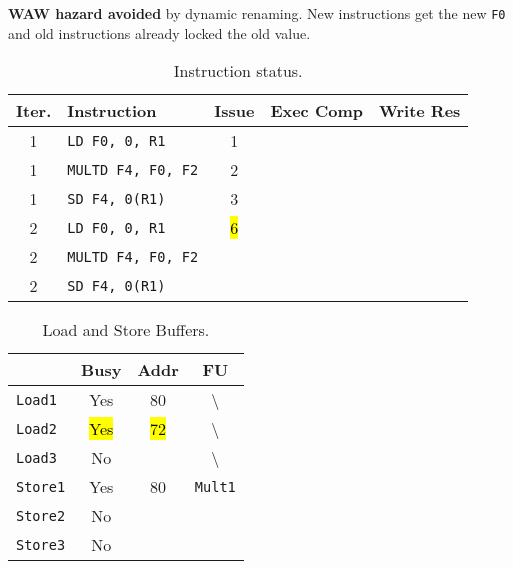 \begin{enumerate}
\begin{itemize}
        \textcolor{Green3}{} \textbf{WAW hazard avoided} by dynamic renaming. New instructions get the new \texttt{F0} and old instructions already locked the old value.
    \end{itemize}
    \begin{table}[!htp]
        \centering
        \begin{tabular}{@{} c l | c c c @{}}
            \toprule
            Iter.       & Instruction                   & Issue & Exec Comp & Write Res \\
            \midrule
            1           & \texttt{LD    F0, 0, R1}      & 1     &           &           \\ [.3em]
            1           & \texttt{MULTD F4, F0, F2}     & 2     &           &           \\ [.3em]
            1           & \texttt{SD    F4, 0(R1)}      & 3     &           &           \\ [.3em]
            2           & \texttt{LD    F0, 0, R1}      & \hl{6}&           &           \\ [.3em]
            2           & \texttt{MULTD F4, F0, F2}     &       &           &           \\ [.3em]
            2           & \texttt{SD    F4, 0(R1)}      &       &           &           \\
            \bottomrule
        \end{tabular}
        \caption*{Instruction status.}
    \end{table}

    \begin{table}[!htp]
        \centering
        \begin{tabular}{@{} l | c c c @{}}
            \toprule
                                & Busy      & Addr      & FU   \\
            \midrule
            \texttt{Load1}      & Yes       & 80        & \textbackslash        \\ [.3em]
            \texttt{Load2}      & \hl{Yes}  & \hl{72}   & \textbackslash        \\ [.3em]
            \texttt{Load3}      & No        &           & \textbackslash        \\
            \cmidrule{1-4}
            \texttt{Store1}     & Yes       & 80        & \texttt{Mult1}        \\ [.3em]
            \texttt{Store2}     & No        &           &                       \\ [.3em]
            \texttt{Store3}     & No        &           &                       \\
            \bottomrule
        \end{tabular}
        \caption*{Load and Store Buffers.}
    \end{table}


\end{enumerate}
